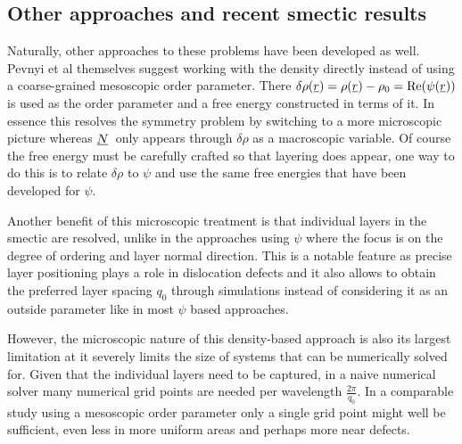 \documentclass[12pt]{article}
\newcommand{\suf}[2]{\stackunder[0.5pt]{\stackunder[1pt]{\ensuremath{#1}}{\rule{\widthof{\ensuremath{#2}}*\real{0.9}}{.1ex}}}{}}
\newcommand{\su}[1]{\suf{#1}{#1}}
\newcommand{\NN}{\ensuremath{\su{N}}}
\begin{document}
    \subsection{Other approaches and recent smectic results}\label{sec:intro_sm_other}
        Naturally, other approaches to these problems have been developed as well.
        Pevnyi et al themselves suggest working with the density directly instead of using a coarse-grained mesoscopic order parameter\cite{pevnyiModelingSmecticLayers2014,xiaStructuralLandscapesGeometrically2021,farrellFiniteelementDiscretizationSmectic2023,xiaSimpleTensorialTheory2024}.
        There $\delta\rho(\su{r}) = \rho(\su{r}) - \rho_0 = \Re(\psi(\su{r}))$ is used as the order parameter and a free energy constructed in terms of it.
        In essence this resolves the symmetry problem by switching to a more microscopic picture whereas \NN\ only appears through $\delta\rho$ as a macroscopic variable.
        Of course the free energy must be carefully crafted so that layering does appear, one way to do this is to relate $\delta\rho$ to $\psi$ and use the same free energies that have been developed for $\psi$\cite{pevnyiModelingSmecticLayers2014}.

        Another benefit of this microscopic treatment is that individual layers in the smectic are resolved, unlike in the approaches using $\psi$ where the focus is on the degree of ordering and layer normal direction.
        This is a notable feature as precise layer positioning plays a role in dislocation defects  and it also allows to obtain the preferred layer spacing $q_0$ through simulations instead of considering it as an outside parameter like in most $\psi$ based approaches.

        However, the microscopic nature of this density-based approach is also its largest limitation at it severely limits the size of systems that can be numerically solved for.
        Given that the individual layers need to be captured, in a naive numerical solver many numerical grid points are needed per wavelength $\frac{2\pi}{q_0}$.
        In a comparable study using a mesoscopic order parameter only a single grid point might well be sufficient, even less in more uniform areas and perhaps more near defects.
\end{document}
